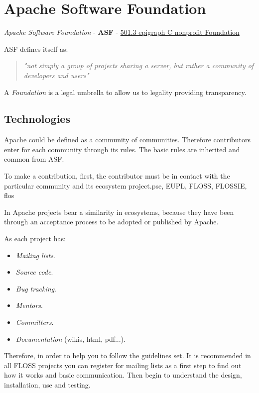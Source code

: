 \section{Apache Software Foundation}
\label{sec:asf}

\textit{Apache Software Foundation} - \textbf{ASF} - \href{http://en.wikipedia.org/wiki/501(c)_organization#501.28c.29.283.29}{501.3 epigraph C nonprofit Foundation}

ASF defines itself as:
\begin{quotation}
    \emph{"not simply a group of projects sharing a server, but rather a community of developers and users"}
\end{quotation}

A \textit{Foundation} is a legal umbrella to allow us to legality providing transparency.

\subsection{Technologies}

\par Apache could be defined as a community of communities. Therefore contributors enter for each community through its rules. The basic rules are inherited and common from ASF.

\par To make a contribution, first, the contributor must be in contact with the particular community and its ecosystem project.pse, EUPL, FLOSS, FLOSSIE, flos

\par In Apache projects bear a similarity in ecosystems, because they have been through an acceptance process to be adopted or published by Apache.

\par As each project has:
\begin{itemize}
	\item \textit{Mailing lists}.
	\item \textit{Source code}.
	\item \textit{Bug tracking}.
	\item \textit{Mentors}.
	\item \textit{Committers}.
	\item \textit{Documentation} (wikis, html, pdf...).
\end{itemize} Therefore, in order to help you to follow the guidelines set. It is recommended in all FLOSS projects you can register for mailing lists as a first step to find out how it works and basic communication. Then begin to understand the design, installation, use and testing.

